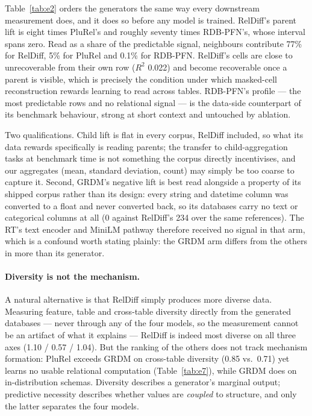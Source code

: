 Table~\ref{tab:e2} orders the generators the same way every downstream measurement does, and it
does so before any model is trained. RelDiff's parent lift is eight times PluRel's and roughly
seventy times RDB-PFN's, whose interval spans zero. Read as a share of the predictable signal,
neighbours contribute 77\% for RelDiff, 5\% for PluRel and 0.1\% for RDB-PFN. RelDiff's cells are
close to unrecoverable from their own row ($R^2$ 0.022) and become recoverable once a parent is
visible, which is precisely the condition under which masked-cell reconstruction rewards learning
to read across tables. RDB-PFN's profile --- the most predictable rows and no relational signal
--- is the data-side counterpart of its benchmark behaviour, strong at short context and untouched
by ablation.

Two qualifications. Child lift is flat in every corpus, RelDiff included, so what its data
rewards specifically is reading parents; the transfer to child-aggregation tasks at benchmark time
is not something the corpus directly incentivises, and our aggregates (mean, standard deviation,
count) may simply be too coarse to capture it. Second, GRDM's negative lift is best read alongside
a property of its shipped corpus rather than its design: every string and datetime column was
converted to a float and never converted back, so its databases carry no text or categorical
columns at all (0 against RelDiff's 234 over the same references). The RT's text encoder and
MiniLM pathway therefore received no signal in that arm, which is a confound worth stating
plainly: the GRDM arm differs from the others in more than its generator.

\paragraph{Diversity is not the mechanism.}
A natural alternative is that RelDiff simply produces more diverse data. Measuring feature, table
and cross-table diversity directly from the generated databases --- never through any of the four
models, so the measurement cannot be an artifact of what it explains --- RelDiff is indeed most
diverse on all three axes (1.10 / 0.57 / 1.04). But the ranking of the others does not track
mechanism formation: PluRel exceeds GRDM on cross-table diversity (0.85 vs.\ 0.71) yet learns no
usable relational computation (Table~\ref{tab:e7}), while GRDM does on in-distribution schemas.
Diversity describes a generator's marginal output; predictive necessity describes whether values
are \emph{coupled} to structure, and only the latter separates the four models.
